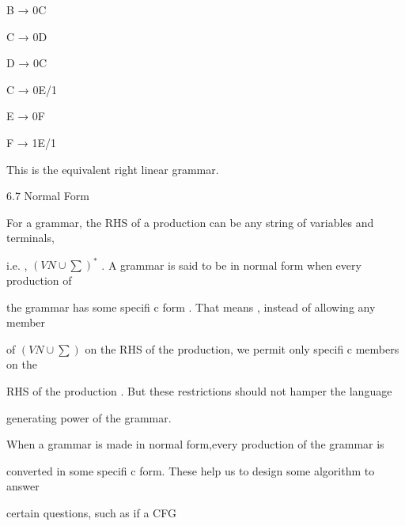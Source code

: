 \documentclass[10pt,a4paper]{book}
\begin{document}
\qquad\qquad\qquad\qquad\qquad\qquad\qquad\qquad B → 0C

\qquad\qquad\qquad\qquad\qquad\qquad\qquad\qquad C → 0D

\qquad\qquad\qquad\qquad\qquad\qquad\qquad\qquad D → 0C

\qquad\qquad\qquad\qquad\qquad\qquad\qquad\qquad C → 0E/1

\qquad\qquad\qquad\qquad\qquad\qquad\qquad\qquad E → 0F

\qquad\qquad\qquad\qquad\qquad\qquad\qquad\qquad F → 1E/1

\quad

This is the equivalent right linear grammar.

\qquad

\begin{flushleft}
  \!\!\!\!\!\large 6.7 \; \textsf{Normal Form}
\end{flushleft}
\begin{flushleft}

\!\!\!\!For a grammar, the RHS of a production can be any string of variables and terminals,

\!\!\!\!i.e. , $(VN \cup \sum)^{*}$ . A grammar is said to be in normal form when every production of
 
\!\!\!\!the grammar has some specifi c form .
That means\; ,\; instead of allowing any member
 
\!\!\!\!\!of $(VN \cup \sum)$ on the RHS of the production, we permit only
specifi c members on the
 
\!\!\!\!\!RHS of the production . But these restrictions should not hamper the language

\!\!\!\!generating power of the grammar.

When a grammar is made in normal form\quad,\quad every production of the grammar is

\!\!\!\!converted in some specifi c form. These help us to design some algorithm to answer
 
\!\!\!\!certain questions, such as if a CFG
\end{flushleft}
\end{document}
